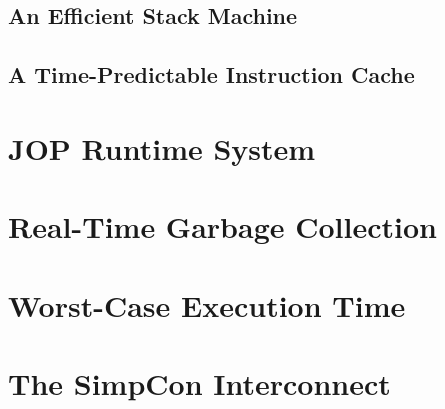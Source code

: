 \clearpage
    \section{An Efficient Stack Machine}
    \label{sec:stack}
    

\clearpage
    
\clearpage
    

\clearpage
    \section{A Time-Predictable Instruction Cache}
    \label{sec:cache}
    

\chapter{JOP Runtime System}
\label{chap:runtime}

    
    
    
%    
\clearpage
    
    

\chapter{Real-Time Garbage Collection}
\label{chap:rtgc}
    

\chapter{Worst-Case Execution Time}
\label{chap:wcet}
    

\chapter{The SimpCon Interconnect}
\label{chap:simpcon}
\newcommand{\scgrsc}{.65}
\newcommand{\scgrp}{simpcon}



%

%    

